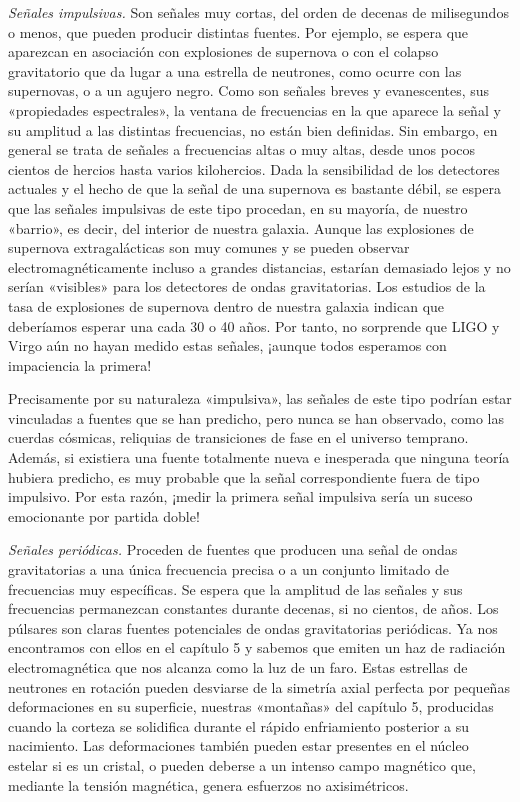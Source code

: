 \emph{Señales impulsivas.} Son señales muy cortas, del orden de decenas de milisegundos o menos, que pueden producir distintas fuentes. Por ejemplo, se espera que aparezcan en asociación con explosiones de supernova o con el colapso gravitatorio que da lugar a una estrella de neutrones, como ocurre con las supernovas, o a un agujero negro. Como son señales breves y evanescentes, sus «propiedades espectrales», la ventana de frecuencias en la que aparece la señal y su amplitud a las distintas frecuencias, no están bien definidas. Sin embargo, en general se trata de señales a frecuencias altas o muy altas, desde unos pocos cientos de hercios hasta varios kilohercios. Dada la sensibilidad de los detectores actuales y el hecho de que la señal de una supernova es bastante débil, se espera que las señales impulsivas de este tipo procedan, en su mayoría, de nuestro «barrio», es decir, del interior de nuestra galaxia. Aunque las explosiones de supernova extragalácticas son muy comunes y se pueden observar electromagnéticamente incluso a grandes distancias, estarían demasiado lejos y no serían «visibles» para los detectores de ondas gravitatorias. Los estudios de la tasa de explosiones de supernova dentro de nuestra galaxia indican que deberíamos esperar una cada 30 o 40 años. Por tanto, no sorprende que LIGO y Virgo aún no hayan medido estas señales, ¡aunque todos esperamos con impaciencia la primera!

Precisamente por su naturaleza «impulsiva», las señales de este tipo podrían estar vinculadas a fuentes que se han predicho, pero nunca se han observado, como las cuerdas cósmicas, reliquias de transiciones de fase en el universo temprano. Además, si existiera una fuente totalmente nueva e inesperada que ninguna teoría hubiera predicho, es muy probable que la señal correspondiente fuera de tipo impulsivo. Por esta razón, ¡medir la primera señal impulsiva sería un suceso emocionante por partida doble!

\emph{Señales periódicas.} Proceden de fuentes que producen una señal de ondas gravitatorias a una única frecuencia precisa o a un conjunto limitado de frecuencias muy específicas. Se espera que la amplitud de las señales y sus frecuencias permanezcan constantes durante decenas, si no cientos, de años. Los púlsares son claras fuentes potenciales de ondas gravitatorias periódicas. Ya nos encontramos con ellos en el capítulo 5 y sabemos que emiten un haz de radiación electromagnética que nos alcanza como la luz de un faro. Estas estrellas de neutrones en rotación pueden desviarse de la simetría axial perfecta por pequeñas deformaciones en su superficie, nuestras «montañas» del capítulo 5, producidas cuando la corteza se solidifica durante el rápido enfriamiento posterior a su nacimiento. Las deformaciones también pueden estar presentes en el núcleo estelar si es un cristal, o pueden deberse a un intenso campo magnético que, mediante la tensión magnética, genera esfuerzos no axisimétricos.


